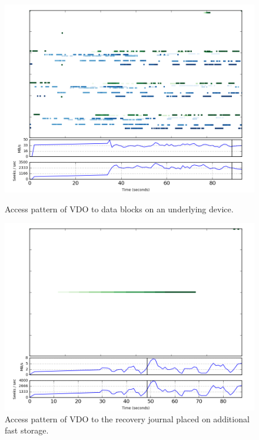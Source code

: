 \documentclass[
  color, %
  table, %
  lof,   %
  lot,   %
]{fithesis3}
\begin{document}
\begin{figure}[!htb]
        \centering
        \includegraphics[width=\textwidth]{../results/journal/seeks/snaps/ssd_testlv}
\caption[Access pattern of VDO to data blocks on an underlying device]{Access pattern of VDO to data blocks on an underlying device.}
\label{fig:journal-LV}
        \centering
        \includegraphics[width=\textwidth]{../results/journal/seeks/snaps/ssd}
\caption[Access pattern of VDO to the recovery journal.]{Access pattern of VDO to the recovery journal placed on additional fast storage.}
\label{fig:journal-SSD}
\end{figure}
\end{document}
